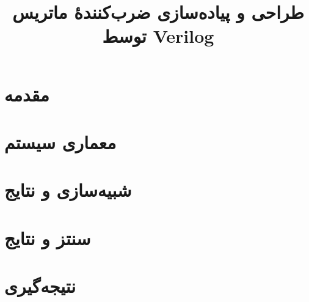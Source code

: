 \documentclass[conference]{IEEEtran-ModifiedForMVIP}
\begin{document}
\IEEEoverridecommandlockouts 

\title{
طراحی و پیاده‌سازی ضرب‌کنندهٔ ماتریس توسط Verilog
}

\author{
}

\maketitle
\begin{abstract}
\end{abstract}
\begin{IEEEkeywords}
\end{IEEEkeywords}


\section{مقدمه}

\section{معماری سیستم}

\section{شبیه‌سازی و نتایج}

\section{سنتز و نتایج}

\section{نتیجه‌گیری}

\end{document}
